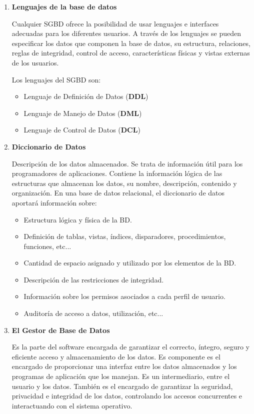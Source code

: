 \begin{enumerate}
    \item \textbf{Lenguajes de la base de datos}

    Cualquier SGBD ofrece la posibilidad de usar lenguajes e interfaces adecuadas para los diferentes usuarios. A través de los lenguajes se pueden especificar los datos que componen la base de datos, su estructura, relaciones, reglas de integridad, control de acceso, características físicas y vistas externas de los usuarios.

    Los lenguajes del SGBD son:

    \begin{itemize}
        \item Lenguaje de Definición de Datos (\textbf{DDL})
        \item Lenguaje de Manejo de Datos (\textbf{DML})
        \item Lenguaje de Control de Datos (\textbf{DCL})
    \end{itemize}

    \item \textbf{Diccionario de Datos}

    Descripción de los datos almacenados. Se trata de información útil para los programadores de aplicaciones. Contiene la información lógica de las estructuras que almacenan los datos, su nombre, descripción, contenido y organización. En una base de datos relacional, el diccionario de datos aportará información sobre:

    \begin{itemize}
        \item Estructura lógica y física de la BD.
        \item Definición de tablas, vistas, índices, disparadores, procedimientos, funciones, etc...
        \item Cantidad de espacio asignado y utilizado por los elementos de la BD.
        \item Descripción de las restricciones de integridad.
        \item Información sobre los permisos asociados a cada perfil de usuario.
        \item Auditoría de acceso a datos, utilización, etc...
    \end{itemize}

    \item \textbf{El Gestor de Base de Datos}

    Es la parte del software encargada de garantizar el correcto, íntegro, seguro y eficiente acceso y almacenamiento de los datos. Es componente es el encargado de proporcionar una interfaz entre los datos almacenados y los programas de aplicación que los manejan. Es un intermediario, entre el usuario y los datos. También es el encargado de garantizar la seguridad, privacidad e integridad de los datos, controlando los accesos concurrentes e interactuando con el sistema operativo.


\end{enumerate}

